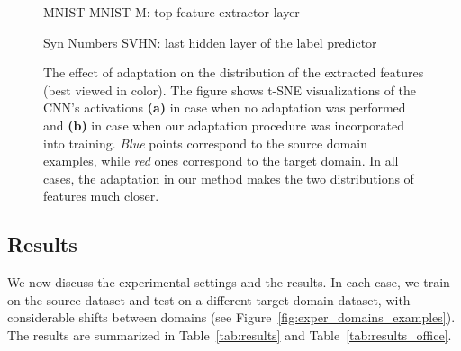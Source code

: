 \documentclass{article}
\newcommand{\fig}[1]{Figure~\ref{fig:#1}}
\newcommand{\tab}[1]{Table~\ref{tab:#1}}
\begin{document}
\begin{figure*}
  \addtolength{\subfigcapskip}{0.1cm}
  \centering
  \begin{minipage}{.5\textwidth}
  \centering
  \small{{\sc MNIST  MNIST-M}: top feature extractor layer}
  \setcounter{subfigure}{0}
  \hspace*{\fill}\hfill {}\hspace*{\fill}\end{minipage}\begin{minipage}{.5\textwidth}
  \centering
  \small{{\sc Syn Numbers  SVHN}: last hidden layer of the label predictor}
  \setcounter{subfigure}{0}
  \hspace*{\fill}\hfill {}\hspace*{\fill}\end{minipage}
  \caption{The effect of adaptation on the distribution of the extracted features (best viewed in color). The figure shows t-SNE \cite{Maaten13} visualizations of the CNN's activations {\bf (a)} in case when no adaptation was performed and {\bf (b)} in case when our adaptation procedure was incorporated into training. {\it Blue} points correspond to the source domain examples, while {\it red} ones correspond to the target domain. In all cases, the adaptation in our method makes the two distributions of features much closer.}
  \label{fig:exper_adapt_vis}
\end{figure*}

\subsection{Results}
\label{sect:exper_quant}

We now discuss the experimental settings and the results. In each case, we train on the source dataset and test on a different target domain dataset, with considerable shifts between domains (see \fig{exper_domains_examples}). The results are summarized in \tab{results} and \tab{results_office}. 
\end{document}
